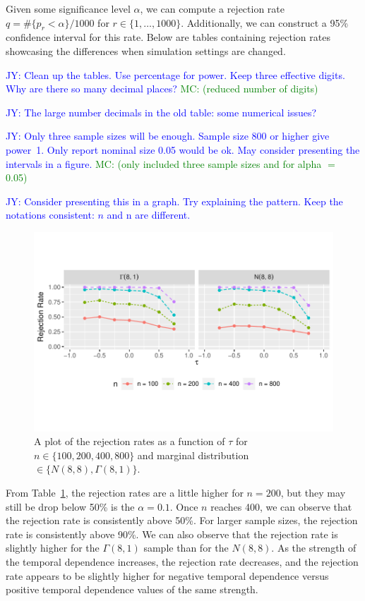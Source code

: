 \documentclass[12pt, titlepage, letterpaper]{article}
\newcommand{\jy}[1]{\textcolor{blue}{JY: #1}}
\newcommand{\mc}[1]{\textcolor{green}{MC: (#1)}}
\begin{document}
{Given some significance level $\alpha$, we can compute a rejection rate 
$q = \#\{p_r < \alpha\} / 1000$ for $r \in \{1, \ldots, 1000\}$.
Additionally, we can construct a 95\% confidence interval for 
this rate. Below are tables containing rejection rates showcasing the 
differences when simulation settings are changed.

\jy{Clean up the tables. Use percentage for power. Keep three effective
  digits. Why are there so many decimal places? }
\mc{reduced number of digits}

\jy{The large number decimals in the old table: some numerical issues?}

\jy{Only three sample sizes will be enough. Sample size 800 or higher give
  power~1. Only report nominal size 0.05 would be ok. May consider presenting
  the intervals in a figure.}
\mc{only included three sample sizes and for alpha $=$ 0.05}


\jy{Consider presenting this in a graph. Try explaining the pattern.
  Keep the notations consistent: $n$ and n are different.}


\begin{figure}[tbp]
  \centering
  \includegraphics[scale=1]{figures/rr}
  \caption{A plot of the rejection rates as a function of $\tau$ for
 $n \in \{100, 200, 400, 800\}$ and marginal distribution 
 $\in \{N(8,8), \Gamma(8,1)\}$.}
  \label{fig:rr}
\end{figure}


From 
Table~\ref{fig:rr}, 
the rejection rates are a little higher for $n = 200$, but they may still be 
drop below 50\% is the $\alpha = 0.1$. Once $n$ reaches 400, we can observe 
that the rejection rate
is consistently above 50\%. For larger sample sizes, the rejection rate is 
consistently above 90\%. We can also
observe that the rejection rate is slightly higher for the $\Gamma(8, 1)$ sample 
than for 
the $N(8, 8)$. As the strength of the temporal dependence increases, the 
rejection rate decreases, and the rejection
rate appears to be slightly higher for negative temporal dependence versus 
positive temporal dependence values of the same strength.


}
\end{document}
